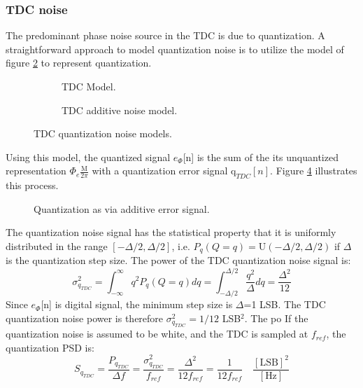 	\subsubsection{TDC noise}\label{tdc_noise}
		The predominant phase noise source in the TDC is due to quantization. A straightforward approach to model quantization noise is to utilize the model of figure \ref{fig:tdc_add_pn} to represent quantization.
		\begin{figure}[htb!]
		    \centering
		    \begin{subfigure}{0.5\textwidth}
		        \centering
		        
		        \caption{TDC Model.}
		        \label{fig:tdc1}
		    \end{subfigure}%
		    \begin{subfigure}{0.5\textwidth}
		        \centering
		        
		        \caption{TDC additive noise model.}
		        \label{fig:tdc_add_pn}
		    \end{subfigure}
		    \label{fig:tdc_pn_model}
		    \caption{TDC quantization noise models.}
		\end{figure}
		\FloatBarrier
		Using this model, the quantized signal $e_\Phi$[n] is the sum of the its unquantized representation $\Phi_e\frac{\mathrm{M}}{2\pi}$ with a quantization error signal $\mathrm{q}_{TDC}[n]$. Figure \ref{fig:quantization} illustrates this process.
		\begin{figure}[htb!]
			\center
			\caption{Quantization as via additive error signal.}
			\label{fig:quantization}
		\end{figure}
		\FloatBarrier
		The quantization noise signal has the statistical property that it is uniformly distributed in the range $[-\Delta/2, \Delta/2]$, i.e. $P_q(Q=q) =\mathrm{U}(-\Delta/2, \Delta/2)$ if $\Delta$ is the quantization step size. The power of the TDC quantization noise signal is:
		\begin{equation}\label{eq:tdc_noise}
			\sigma_{q_{TDC}}^2 = \int_{-\infty}^\infty q^2P_q(Q=q)dq =  \int_{-\Delta/2}^{\Delta/2}\frac{q^2}{\Delta}dq = \frac{\Delta^2}{12}
		\end{equation}
		Since $e_\Phi$[n] is digital signal, the minimum step size is $\Delta$=1 LSB. The TDC quantization noise power is therefore $\sigma_{q_{TDC}}^2 = 1/12$ LSB$^2$. The po
		If the quantization noise is assumed to be white, and the TDC is sampled at $f_{ref}$, the quantization PSD is:
		\begin{equation}
			S_{q_{TDC}} = \frac{P_{q_{TDC}}}{\Delta f} = \frac{\sigma_{q_{TDC}}^2}{f_{ref}} = \frac{\Delta^2}{12f_{ref}} = \frac{1}{12f_{ref}} \hspace{1em}\frac{[\text{LSB}]^2}{[\text{Hz}]}
		\end{equation}

